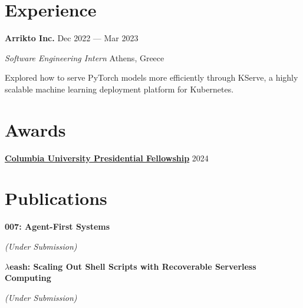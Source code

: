 \documentclass[margin,12pt]{resume}
\newcommand{\cvName}{Nikos Pagonas}
\newcommand{\descriptionVSpace}{\vspace{0.5ex}\xspace}
\newcommand{\subsectionVSpace}{\vspace{3.5ex}\xspace}
\newcommand{\sectionVSpace}{\vspace{1ex}\xspace} %
\newcommand{\sectionVSpaceCorrection}{\vspace{-3.5ex}} %
\newcommand{\header}[1]{\textbf{#1}\xspace}
\newcommand{\authors}[1]{#1\xspace}
\newcommand{\company}[1]{\header{#1}\xspace}
\newcommand{\equalContributionNote}{(*equal contribution)\xspace}
\newcommand{\fellowship}[1]{\header{#1}\xspace}
\newcommand{\interval}[2]{#1 --- #2\xspace}
\newcommand{\me}{\textbf{\cvName}\xspace}
\newcommand{\ordinal}[1]{\textsuperscript{#1}\xspace}
\newcommand{\paperTitle}[1]{\header{#1}\xspace}
\newcommand{\place}[1]{#1\xspace}
\newcommand{\role}[1]{\textit{#1}\xspace}
\newcommand{\underSubmission}{\textit{(Under Submission)}\xspace}
\newcommand{\venue}[1]{\textit{#1}\xspace}
\newenvironment{rSubsection}{}{\par\subsectionVSpace}
\newenvironment{rSection}[1]{\sectionVSpaceCorrection\section{#1}\xspace}{\sectionVSpace\par}
\newenvironment{jobDuties}{\descriptionVSpace}{\par}
\begin{document}
\begin{resume}
\begin{rSection}{Experience}

        \begin{rSubsection}
            \company{Arrikto Inc.} \hfill \interval{Dec 2022}{Mar 2023}

            \role{Software Engineering Intern} \hfill \place{Athens, Greece}

            \begin{jobDuties}
                Explored how to serve PyTorch models more efficiently through KServe, a highly scalable machine learning deployment platform for Kubernetes.
            \end{jobDuties}
        \end{rSubsection}
    \end{rSection}


    \begin{rSection}{Awards}
        \begin{rSubsection}
            \fellowship{\href{https://www.cs.columbia.edu/2024/meet-the-scholars-phd-students-with-prestigious-fellowships/}{Columbia University Presidential Fellowship}} \hfill 2024
        \end{rSubsection}
    \end{rSection}

    \begin{rSection}{Publications}
        \begin{rSubsection}
            \paperTitle{007: Agent-First Systems}

            \underSubmission


        \end{rSubsection}

        \begin{rSubsection}
            \paperTitle{\( \lambda \)eash: Scaling Out Shell Scripts with Recoverable Serverless Computing}

            \underSubmission


\end{rSubsection}
\end{rSection}
\end{resume}
\end{document}
